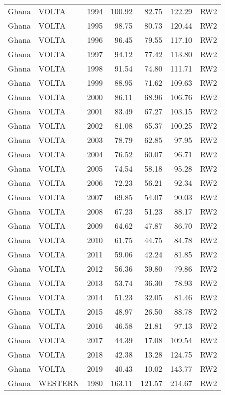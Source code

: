 \begin{longtable}{lllrrrl}
  Ghana & VOLTA & 1994 & 100.92 & 82.75 & 122.29 & RW2 \\ 
  Ghana & VOLTA & 1995 & 98.75 & 80.73 & 120.44 & RW2 \\ 
  Ghana & VOLTA & 1996 & 96.45 & 79.55 & 117.10 & RW2 \\ 
  Ghana & VOLTA & 1997 & 94.12 & 77.42 & 113.80 & RW2 \\ 
  Ghana & VOLTA & 1998 & 91.54 & 74.80 & 111.71 & RW2 \\ 
  Ghana & VOLTA & 1999 & 88.95 & 71.62 & 109.63 & RW2 \\ 
  Ghana & VOLTA & 2000 & 86.11 & 68.96 & 106.76 & RW2 \\ 
  Ghana & VOLTA & 2001 & 83.49 & 67.27 & 103.15 & RW2 \\ 
  Ghana & VOLTA & 2002 & 81.08 & 65.37 & 100.25 & RW2 \\ 
  Ghana & VOLTA & 2003 & 78.79 & 62.85 & 97.95 & RW2 \\ 
  Ghana & VOLTA & 2004 & 76.52 & 60.07 & 96.71 & RW2 \\ 
  Ghana & VOLTA & 2005 & 74.54 & 58.18 & 95.28 & RW2 \\ 
  Ghana & VOLTA & 2006 & 72.23 & 56.21 & 92.34 & RW2 \\ 
  Ghana & VOLTA & 2007 & 69.85 & 54.07 & 90.03 & RW2 \\ 
  Ghana & VOLTA & 2008 & 67.23 & 51.23 & 88.17 & RW2 \\ 
  Ghana & VOLTA & 2009 & 64.62 & 47.87 & 86.70 & RW2 \\ 
  Ghana & VOLTA & 2010 & 61.75 & 44.75 & 84.78 & RW2 \\ 
  Ghana & VOLTA & 2011 & 59.06 & 42.24 & 81.85 & RW2 \\ 
  Ghana & VOLTA & 2012 & 56.36 & 39.80 & 79.86 & RW2 \\ 
  Ghana & VOLTA & 2013 & 53.74 & 36.30 & 78.93 & RW2 \\ 
  Ghana & VOLTA & 2014 & 51.23 & 32.05 & 81.46 & RW2 \\ 
  Ghana & VOLTA & 2015 & 48.97 & 26.50 & 88.78 & RW2 \\ 
  Ghana & VOLTA & 2016 & 46.58 & 21.81 & 97.13 & RW2 \\ 
  Ghana & VOLTA & 2017 & 44.39 & 17.08 & 109.54 & RW2 \\ 
  Ghana & VOLTA & 2018 & 42.38 & 13.28 & 124.75 & RW2 \\ 
  Ghana & VOLTA & 2019 & 40.43 & 10.02 & 143.77 & RW2 \\ 
  Ghana & WESTERN & 1980 & 163.11 & 121.57 & 214.67 & RW2 \\ 

\end{longtable}
